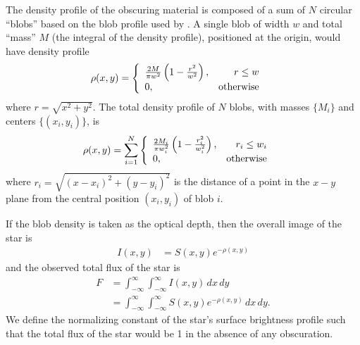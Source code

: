 \documentclass[a4paper,fleqn,usenatbib]{mnras}
\begin{document}
The density profile of the obscuring material is composed of a sum of
$N$ circular ``blobs'' based on the blob profile
used by \citet{lensing2}. A single blob of width $w$ and total ``mass'' $M$
(the integral of the density profile),
positioned at the origin, would have density profile
\begin{align}
\rho(x, y) &= \left\{
        \begin{array}{lr}
            \frac{2M}{\pi w^2}\left(1 - \frac{r^2}{w^2}\right), & r \leq w\\
            0, & \textnormal{otherwise}
        \end{array}\right.
\end{align}
where $r = \sqrt{x^2 + y^2}$. The total density profile of $N$ blobs,
with masses $\{M_i\}$ and centers $\{(x_i, y_i)\}$, is
\begin{align}
\rho(x, y) &= \sum_{i=1}^N
        \left\{
        \begin{array}{lr}
            \frac{2M_i}{\pi w_i^2}
                \left(1 - \frac{r_i^2}{w_i^2}\right), & r_i \leq w_i\\
            0, & \textnormal{otherwise}
        \end{array}\right.
\end{align}
where $r_i = \sqrt{(x - x_i)^2 + (y - y_i)^2}$ is the distance of a point
in the $x-y$ plane from the central position $(x_i, y_i)$ of blob $i$.

If the blob density is taken as the optical depth, then the overall image
of the star is
\begin{align}
I(x, y) &= S(x, y)e^{-\rho(x,y)}
\end{align}
and the observed total flux of the star is
\begin{align}
F &= \int_{-\infty}^{\infty}\int_{-\infty}^{\infty}
        I(x, y) \, dx \, dy\\
  &= \int_{-\infty}^{\infty}\int_{-\infty}^{\infty}
        S(x, y)e^{-\rho(x,y)} \, dx \, dy.
\end{align}
We define the normalizing constant of the star's surface brightness profile
such that the total flux of the star would be 1 in the absence of any
obscuration.
\end{document}
